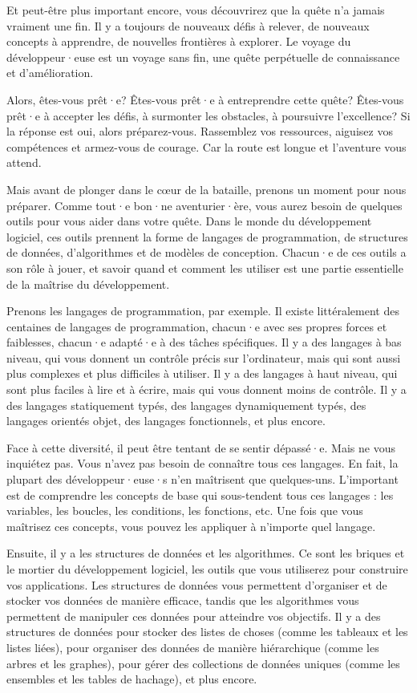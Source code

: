 Et peut-être plus important encore, vous découvrirez que la quête n'a jamais vraiment une fin. Il y a toujours de nouveaux défis à relever, de nouveaux concepts à apprendre, de nouvelles frontières à explorer. Le voyage du développeur·euse est un voyage sans fin, une quête perpétuelle de connaissance et d'amélioration.

Alors, êtes-vous prêt·e? Êtes-vous prêt·e à entreprendre cette quête? Êtes-vous prêt·e à accepter les défis, à surmonter les obstacles, à poursuivre l'excellence? Si la réponse est oui, alors préparez-vous. Rassemblez vos ressources, aiguisez vos compétences et armez-vous de courage. Car la route est longue et l'aventure vous attend.

Mais avant de plonger dans le cœur de la bataille, prenons un moment pour nous préparer. Comme tout·e bon·ne aventurier·ère, vous aurez besoin de quelques outils pour vous aider dans votre quête. Dans le monde du développement logiciel, ces outils prennent la forme de langages de programmation, de structures de données, d'algorithmes et de modèles de conception. Chacun·e de ces outils a son rôle à jouer, et savoir quand et comment les utiliser est une partie essentielle de la maîtrise du développement.

Prenons les langages de programmation, par exemple. Il existe littéralement des centaines de langages de programmation, chacun·e avec ses propres forces et faiblesses, chacun·e adapté·e à des tâches spécifiques. Il y a des langages à bas niveau, qui vous donnent un contrôle précis sur l'ordinateur, mais qui sont aussi plus complexes et plus difficiles à utiliser. Il y a des langages à haut niveau, qui sont plus faciles à lire et à écrire, mais qui vous donnent moins de contrôle. Il y a des langages statiquement typés, des langages dynamiquement typés, des langages orientés objet, des langages fonctionnels, et plus encore.

Face à cette diversité, il peut être tentant de se sentir dépassé·e. Mais ne vous inquiétez pas. Vous n'avez pas besoin de connaître tous ces langages. En fait, la plupart des développeur·euse·s n'en maîtrisent que quelques-uns. L'important est de comprendre les concepts de base qui sous-tendent tous ces langages : les variables, les boucles, les conditions, les fonctions, etc. Une fois que vous maîtrisez ces concepts, vous pouvez les appliquer à n'importe quel langage.

Ensuite, il y a les structures de données et les algorithmes. Ce sont les briques et le mortier du développement logiciel, les outils que vous utiliserez pour construire vos applications. Les structures de données vous permettent d'organiser et de stocker vos données de manière efficace, tandis que les algorithmes vous permettent de manipuler ces données pour atteindre vos objectifs. Il y a des structures de données pour stocker des listes de choses (comme les tableaux et les listes liées), pour organiser des données de manière hiérarchique (comme les arbres et les graphes), pour gérer des collections de données uniques (comme les ensembles et les tables de hachage), et plus encore.

